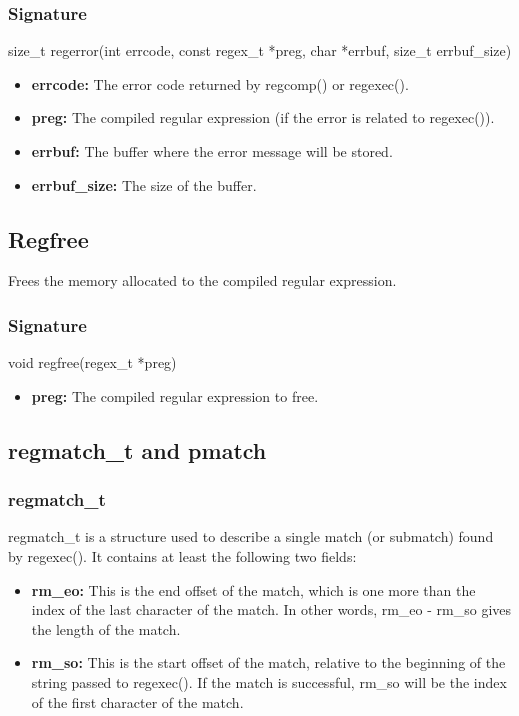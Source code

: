 \documentclass{report}
\begin{document}
    \subsubsection{Signature}
    \bigbreak \noindent 
    \begin{cppcode}
        size_t regerror(int errcode, const regex\_t *preg, char *errbuf, size\_t errbuf\_size)
    \end{cppcode}
    \begin{itemize}
        \item \textbf{errcode:} The error code returned by regcomp() or regexec().
        \item \textbf{preg:} The compiled regular expression (if the error is related to regexec()).
        \item \textbf{errbuf:} The buffer where the error message will be stored.
        \item \textbf{errbuf\_size:} The size of the buffer.
    \end{itemize}

    \bigbreak \noindent 
    \subsection{Regfree}
    \bigbreak \noindent 
    \begin{concept}
        Frees the memory allocated to the compiled regular expression.
    \end{concept}
    \bigbreak \noindent 
    \subsubsection{Signature}
    \bigbreak \noindent 
    \begin{cppcode}
        void regfree(regex\_t *preg)
    \end{cppcode}
    \begin{itemize}
        \item \textbf{preg:} The compiled regular expression to free.
    \end{itemize}

    \pagebreak 
    \subsection{regmatch\_t and pmatch}
    \bigbreak \noindent 
    \subsubsection{regmatch\_t}
    \bigbreak \noindent 
    regmatch\_t is a structure used to describe a single match (or submatch) found by regexec(). It contains at least the following two fields:
    \begin{itemize}
        \item \textbf{rm\_eo:} This is the end offset of the match, which is one more than the index of the last character of the match. In other words, rm\_eo - rm\_so gives the length of the match.
        \item \textbf{rm\_so:} This is the start offset of the match, relative to the beginning of the string passed to regexec(). If the match is successful, rm\_so will be the index of the first character of the match.
    \end{itemize}
    \pagebreak 
\end{document}
